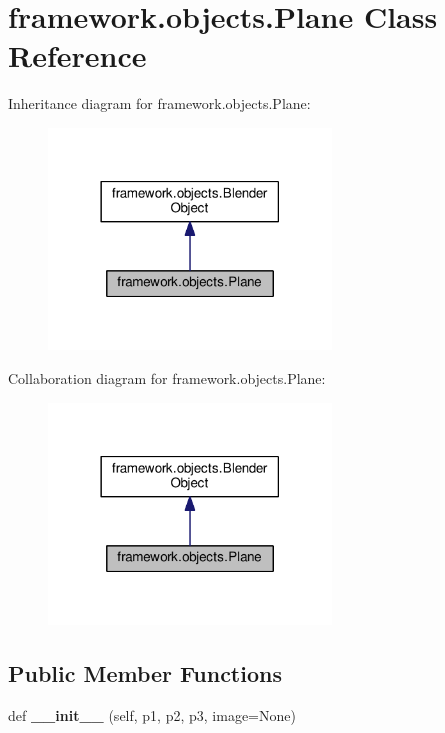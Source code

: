 \hypertarget{classframework_1_1objects_1_1Plane}{}\section{framework.\+objects.\+Plane Class Reference}
\label{classframework_1_1objects_1_1Plane}


Inheritance diagram for framework.\+objects.\+Plane\+:
\nopagebreak
\begin{figure}[H]
\begin{center}
\leavevmode
\includegraphics[width=213pt]{classframework_1_1objects_1_1Plane__inherit__graph}
\end{center}
\end{figure}


Collaboration diagram for framework.\+objects.\+Plane\+:
\nopagebreak
\begin{figure}[H]
\begin{center}
\leavevmode
\includegraphics[width=213pt]{classframework_1_1objects_1_1Plane__coll__graph}
\end{center}
\end{figure}
\subsection*{Public Member Functions}
\begin{DoxyCompactItemize}
\item 
def {\bfseries \+\_\+\+\_\+init\+\_\+\+\_\+} (self, p1, p2, p3, image=None)\hypertarget{classframework_1_1objects_1_1Plane_abc66f95c67f305cfe51077ea7c75c221}{}\label{classframework_1_1objects_1_1Plane_abc66f95c67f305cfe51077ea7c75c221}

\end{DoxyCompactItemize}
